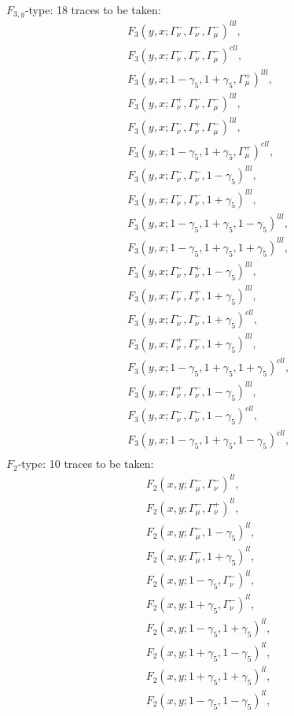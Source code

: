 $F_{3,y}$-type: 18 traces to be taken:
\begin{align*}
&F_3(y,x;\Gamma_\nu^-,\Gamma_\nu^-,\Gamma_\mu^-)^{lll},\\
&F_3(y,x;\Gamma_\nu^-,\Gamma_\nu^-,\Gamma_\mu^-)^{cll},\\
&F_3(y,x;1-\gamma_5,1+\gamma_5,\Gamma_\mu^+)^{lll},\\
&F_3(y,x;\Gamma_\nu^+,\Gamma_\nu^-,\Gamma_\mu^-)^{lll},\\
&F_3(y,x;\Gamma_\nu^-,\Gamma_\nu^+,\Gamma_\mu^-)^{lll},\\
&F_3(y,x;1-\gamma_5,1+\gamma_5,\Gamma_\mu^+)^{cll},\\
&F_3(y,x;\Gamma_\nu^-,\Gamma_\nu^-,1-\gamma_5)^{lll},\\
&F_3(y,x;\Gamma_\nu^-,\Gamma_\nu^-,1+\gamma_5)^{lll},\\
&F_3(y,x;1-\gamma_5,1+\gamma_5,1-\gamma_5)^{lll},\\
&F_3(y,x;1-\gamma_5,1+\gamma_5,1+\gamma_5)^{lll},\\
&F_3(y,x;\Gamma_\nu^-,\Gamma_\nu^+,1-\gamma_5)^{lll},\\
&F_3(y,x;\Gamma_\nu^-,\Gamma_\nu^+,1+\gamma_5)^{lll},\\
&F_3(y,x;\Gamma_\nu^-,\Gamma_\nu^-,1+\gamma_5)^{cll},\\
&F_3(y,x;\Gamma_\nu^+,\Gamma_\nu^-,1+\gamma_5)^{lll},\\
&F_3(y,x;1-\gamma_5,1+\gamma_5,1+\gamma_5)^{cll},\\
&F_3(y,x;\Gamma_\nu^+,\Gamma_\nu^-,1-\gamma_5)^{lll},\\
&F_3(y,x;\Gamma_\nu^-,\Gamma_\nu^-,1-\gamma_5)^{cll},\\
&F_3(y,x;1-\gamma_5,1+\gamma_5,1-\gamma_5)^{cll},\\
\end{align*}
$F_2$-type: 10 traces to be taken:
\begin{align*}
&F_2(x,y;\Gamma_\mu^-,\Gamma_\nu^-)^{ll},\\
&F_2(x,y;\Gamma_\mu^-,\Gamma_\nu^+)^{ll},\\
&F_2(x,y;\Gamma_\mu^-,1-\gamma_5)^{ll},\\
&F_2(x,y;\Gamma_\mu^-,1+\gamma_5)^{ll},\\
&F_2(x,y;1-\gamma_5,\Gamma_\nu^-)^{ll},\\
&F_2(x,y;1+\gamma_5,\Gamma_\nu^-)^{ll},\\
&F_2(x,y;1-\gamma_5,1+\gamma_5)^{ll},\\
&F_2(x,y;1+\gamma_5,1-\gamma_5)^{ll},\\
&F_2(x,y;1+\gamma_5,1+\gamma_5)^{ll},\\
&F_2(x,y;1-\gamma_5,1-\gamma_5)^{ll},\\
\end{align*}
